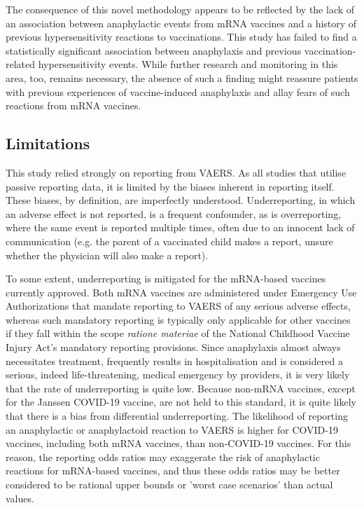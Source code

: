 \documentclass{article}
\begin{document}
The consequence of this novel methodology appears to be reflected by the lack of an association between anaphylactic events from mRNA vaccines and a history of previous hypersensitivity reactions to vaccinations.
This study has failed to find a statistically significant association between anaphylaxis and previous vaccination-related hypersensitivity events.
While further research and monitoring in this area, too, remains necessary, the absence of such a finding might reassure patients with previous experiences of vaccine-induced anaphylaxis and allay fears of such reactions from mRNA vaccines.

\subsection{Limitations}

This study relied strongly on reporting from VAERS.
As all studies that utilise passive reporting data, it is limited by the biases inherent in reporting itself.
These biases, by definition, are imperfectly understood.\cite{singleton1999overview,shimabukuro2015safety,chen1994vaccine}
Underreporting, in which an adverse effect is not reported, is a frequent confounder, as is overreporting, where the same event is reported multiple times, often due to an innocent lack of communication (e.g. the parent of a vaccinated child makes a report, unsure whether the physician will also make a report).

To some extent, underreporting is mitigated for the mRNA-based vaccines currently approved.
Both mRNA vaccines are administered under Emergency Use Authorizations that mandate reporting to VAERS of any serious adverse effects, whereas such mandatory reporting is typically only applicable for other vaccines if they fall within the scope \textit{ratione materiae} of the National Childhood Vaccine Injury Act's mandatory reporting provisions.
Since anaphylaxis almost always necessitates treatment, frequently results in hospitalisation and is considered a serious, indeed life-threatening, medical emergency by providers, it is very likely that the rate of underreporting is quite low.
Because non-mRNA vaccines, except for the Janssen COVID-19 vaccine, are not held to this standard, it is quite likely that there is a bias from differential underreporting.
The likelihood of reporting an anaphylactic or anaphylactoid reaction to VAERS is higher for COVID-19 vaccines, including both mRNA vaccines, than non-COVID-19 vaccines.
For this reason, the reporting odds ratios may exaggerate the risk of anaphylactic reactions for mRNA-based vaccines, and thus these odds ratios may be better considered to be rational upper bounds or 'worst case scenarios' than actual values.
\end{document}
